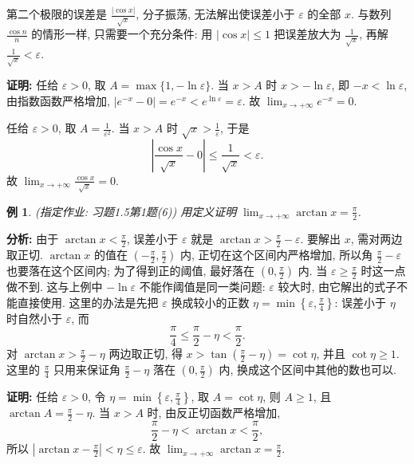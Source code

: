 \documentclass[UTF8,openany]{ctexbook}
\theoremstyle{chinesetextbook}
\newtheorem{example}{例}[section]
\newenvironment{cnproof}{\par\indent\textbf{证明:} \ignorespaces}{\par}
\begin{document}
第二个极限的误差是 $\displaystyle\frac{|\cos x|}{\sqrt x}$, 分子振荡, 无法解出使误差小于 $\varepsilon$ 的全部 $x$. 与数列 $\displaystyle\frac{\cos n}n$ 的情形一样, 只需要一个充分条件: 用 $|\cos x|\le1$ 把误差放大为 $\displaystyle\frac1{\sqrt x}$, 再解 $\displaystyle\frac1{\sqrt x}<\varepsilon$.
\begin{cnproof}
任给 $\varepsilon>0$, 取 $A=\max\{1,-\ln\varepsilon\}$. 当 $x>A$ 时 $x>-\ln\varepsilon$, 即 $-x<\ln\varepsilon$, 由指数函数严格增加, $|e^{-x}-0|=e^{-x}<e^{\ln\varepsilon}=\varepsilon$. 故 $\displaystyle\lim_{x\to+\infty}e^{-x}=0$.

任给 $\varepsilon>0$, 取 $\displaystyle A=\frac1{\varepsilon^2}$. 当 $x>A$ 时 $\displaystyle\sqrt x>\frac1\varepsilon$, 于是
\[
\left|\frac{\cos x}{\sqrt x}-0\right|\le\frac1{\sqrt x}<\varepsilon.
\]
故 $\displaystyle\lim_{x\to+\infty}\frac{\cos x}{\sqrt x}=0$.
\end{cnproof}
\begin{example}
\textnormal{(指定作业: 习题1.5第1题(6))} 用定义证明 $\displaystyle\lim_{x\to+\infty}\arctan x=\frac\pi2$.
\end{example}
\par\indent\textbf{分析:} 由于 $\displaystyle\arctan x<\frac\pi2$, 误差小于 $\varepsilon$ 就是 $\displaystyle\arctan x>\frac\pi2-\varepsilon$. 要解出 $x$, 需对两边取正切. $\arctan x$ 的值在 $\displaystyle\left(-\frac\pi2,\frac\pi2\right)$ 内, 正切在这个区间内严格增加, 所以角 $\displaystyle\frac\pi2-\varepsilon$ 也要落在这个区间内; 为了得到正的阈值, 最好落在 $\displaystyle\left(0,\frac\pi2\right)$ 内. 当 $\displaystyle\varepsilon\ge\frac\pi2$ 时这一点做不到. 这与上例中 $-\ln\varepsilon$ 不能作阈值是同一类问题: $\varepsilon$ 较大时, 由它解出的式子不能直接使用. 这里的办法是先把 $\varepsilon$ 换成较小的正数 $\displaystyle\eta=\min\left\{\varepsilon,\frac\pi4\right\}$: 误差小于 $\eta$ 时自然小于 $\varepsilon$, 而
\[
\frac\pi4\le\frac\pi2-\eta<\frac\pi2.
\]
对 $\displaystyle\arctan x>\frac\pi2-\eta$ 两边取正切, 得 $\displaystyle x>\tan\left(\frac\pi2-\eta\right)=\cot\eta$, 并且 $\cot\eta\ge1$. 这里的 $\displaystyle\frac\pi4$ 只用来保证角 $\displaystyle\frac\pi2-\eta$ 落在 $\displaystyle\left(0,\frac\pi2\right)$ 内, 换成这个区间中其他的数也可以.
\begin{cnproof}
任给 $\varepsilon>0$, 令 $\displaystyle\eta=\min\left\{\varepsilon,\frac\pi4\right\}$, 取 $A=\cot\eta$, 则 $A\ge1$, 且 $\displaystyle\arctan A=\frac\pi2-\eta$. 当 $x>A$ 时, 由反正切函数严格增加,
\[
\frac\pi2-\eta<\arctan x<\frac\pi2,
\]
所以 $\displaystyle\left|\arctan x-\frac\pi2\right|<\eta\le\varepsilon$. 故 $\displaystyle\lim_{x\to+\infty}\arctan x=\frac\pi2$.
\end{cnproof}
\end{document}
